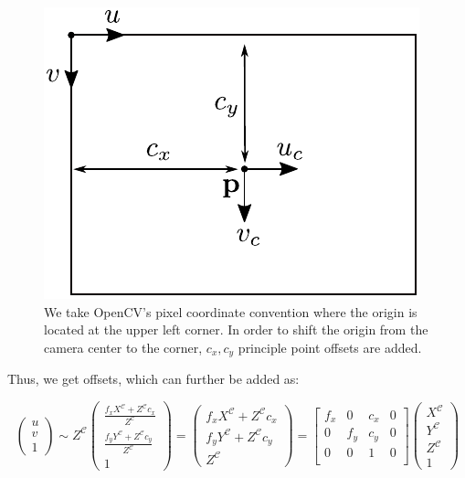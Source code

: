 \documentclass[12pt]{report}
\numberwithin{figure}{section}
\begin{document}
\begin{figure}[H]
	\centering
  \includegraphics[width=0.4\linewidth,natwidth=640,natheight=640]
  {fig/drawings/pinhole_cam_offset.pdf}
	\caption[Principle Point Offset]{We take OpenCV's pixel coordinate 
	convention where the origin is located at the upper left corner. In order 
	to shift the origin from the camera center to the corner, $c_x, c_y$ 
	principle 
	point offsets are added.}
	\label{fig:pinhole_offset}
\end{figure}

Thus, we get offsets, which can further be added as:

\begin{equation}
  \begin{pmatrix}
    u\\
    v\\
    1
  \end{pmatrix}
  \sim
  Z^{\mathcal{C}}
  \begin{pmatrix}
    \frac{f_x X^{\mathcal{C}} + Z^{\mathcal{C}} c_x}{Z^{\mathcal{C}}}\\
    \frac{f_y Y^{\mathcal{C}} + Z^{\mathcal{C}} c_y}{Z^{\mathcal{C}}}\\
    1
  \end{pmatrix}
  =
  \begin{pmatrix}
    f_xX^{\mathcal{C}} + Z^{\mathcal{C}} c_x\\
    f_yY^{\mathcal{C}} + Z^{\mathcal{C}} c_y\\
    Z^{\mathcal{C}}
  \end{pmatrix}
  =
  \begin{bmatrix}
    f_x & 0 & c_x & 0\\
    0 & f_y & c_y & 0\\
    0 & 0 & 1 & 0\\
  \end{bmatrix}
  \begin{pmatrix}
    X^{\mathcal{C}}\\
    Y^{\mathcal{C}}\\
    Z^{\mathcal{C}}\\
    1
  \end{pmatrix}\label{eq:proj_func_w_f_c}
\end{equation} 
\end{document}
